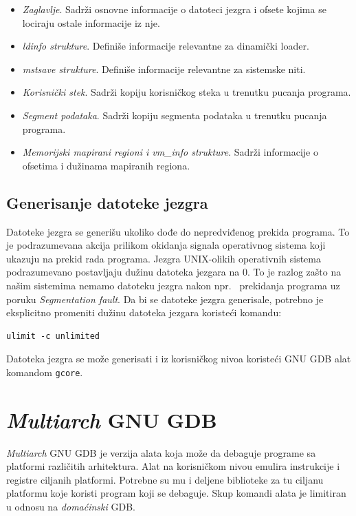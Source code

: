 \documentclass[12pt,oneside]{memoir}
\begin{document}
\begin{itemize}
	\item \emph{Zaglavlje}. Sadrži osnovne informacije o datoteci jezgra i ofsete kojima se lociraju ostale informacije iz nje.
	\item \emph{ldinfo strukture}. Definiše informacije relevantne za dinamički loader.
	\item \emph{mstsave strukture}. Definiše informacije relevantne za sistemske niti.
	\item \emph{Korisnički stek}. Sadrži kopiju korisničkog steka u trenutku pucanja programa.
	\item \emph{Segment podataka}. Sadrži kopiju segmenta podataka u trenutku pucanja programa.
	\item \emph{Memorijski mapirani regioni i vm\_info strukture}. Sadrži informacije o ofsetima i dužinama mapiranih regiona.
\end{itemize}

\subsection{Generisanje datoteke jezgra}

Datoteke jezgra se generišu ukoliko dođe do nepredviđenog prekida programa. To je podrazumevana akcija prilikom okidanja signala operativnog sistema koji ukazuju na prekid rada programa. Jezgra UNIX-olikih operativnih sistema podrazumevano postavljaju dužinu datoteka jezgara na 0. To je razlog zašto na našim sistemima nemamo datoteku jezgra nakon npr.~ prekidanja programa uz poruku \emph{Segmentation fault}. Da bi se datoteke jezgra generisale, potrebno je eksplicitno promeniti dužinu datoteka jezgara koristeći komandu:

\begin{lstlisting}
ulimit -c unlimited

\end{lstlisting}

Datoteka jezgra se može generisati i iz korisničkog nivoa koristeći GNU GDB alat komandom \texttt{gcore}.

\section{\emph{Multiarch} GNU GDB}

\emph{Multiarch} GNU GDB je verzija alata koja može da debaguje programe sa platformi različitih arhitektura. Alat na korisničkom nivou emulira instrukcije i registre ciljanih platformi. Potrebne su mu i deljene biblioteke za tu ciljanu platformu koje koristi program koji se debaguje. Skup komandi alata je limitiran u odnosu na \emph{domaćinski} GDB.
\end{document}
